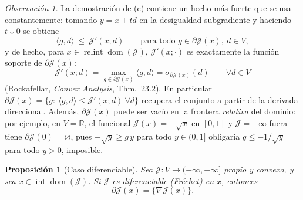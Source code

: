 \documentclass[12pt]{book}
\theoremstyle{definition}
\theoremstyle{plain}
\newtheorem{proposicion}{Proposición}[section]
\theoremstyle{remark}
\newtheorem{observacion}{Observación}[section]
\begin{document}
\begin{observacion}
\label{obs:soporte}
La demostraci\'on de (c) contiene un hecho m\'as fuerte que se usa
constantemente: tomando $y=x+td$ en la desigualdad subgradiente y
haciendo $t\downarrow0$ se obtiene
\begin{equation}
\langle g,d\rangle\ \le\ \mathcal{J}'(x;d)
\qquad\text{para todo }
g\in\partial\mathcal{J}(x),\ d\in V,
\label{eq:menor}
\end{equation}
y de hecho, para
$x\in\operatorname{relint}\operatorname{dom}(\mathcal{J})$,
$\mathcal{J}'(x;\cdot)$ es exactamente la funci\'on soporte de
$\partial\mathcal{J}(x)$:
\[
\mathcal{J}'(x;d)
=\max_{g\in\partial\mathcal{J}(x)}\langle g,d\rangle
=\sigma_{\partial\mathcal{J}(x)}(d)
\qquad\forall d\in V
\]
(Rockafellar, \emph{Convex Analysis}, Thm.~23.2). En particular
$\partial\mathcal{J}(x)=\{g:\ \langle g,d\rangle
\le \mathcal{J}'(x;d)\ \forall d\}$ recupera el conjunto a partir de la
derivada direccional. Adem\'as, $\partial\mathcal{J}(x)$ puede ser
vac\'io en la frontera \emph{relativa} del dominio: por ejemplo, en
$V=\mathbb{R}$, el funcional $\mathcal{J}(x)=-\sqrt{x}$ en $[0,1]$ y
$\mathcal{J}=+\infty$ fuera tiene $\partial\mathcal{J}(0)=\varnothing$,
pues $-\sqrt{y}\ge g\,y$ para todo $y\in(0,1]$ obligar\'ia
$g\le-1/\sqrt{y}$ para todo $y>0$, imposible.
\end{observacion}

\begin{proposicion}[Caso diferenciable]
\label{prop:diferenciable}
Sea $\mathcal{J}\colon V\to(-\infty,+\infty]$ propio y convexo, y sea
$x\in\operatorname{int}\operatorname{dom}(\mathcal{J})$. Si
$\mathcal{J}$ es diferenciable (Fr\'echet) en $x$, entonces
\[
\partial\mathcal{J}(x)
=\bigl\{\nabla\mathcal{J}(x)\bigr\}.
\]
\end{proposicion}
\end{document}
